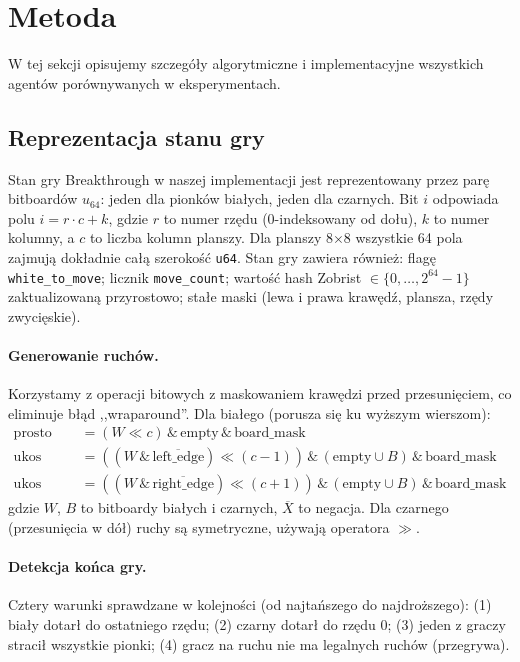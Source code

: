\section{Metoda}
\label{sec:metoda}

W tej sekcji opisujemy szczegóły algorytmiczne i implementacyjne wszystkich
agentów porównywanych w eksperymentach.

\subsection{Reprezentacja stanu gry}

Stan gry Breakthrough w naszej implementacji jest reprezentowany przez parę
bitboardów $u_{64}$: jeden dla pionków białych, jeden dla czarnych. Bit $i$
odpowiada polu $i = r \cdot c + k$, gdzie $r$ to numer rzędu (0-indeksowany
od dołu), $k$ to numer kolumny, a $c$ to liczba kolumn planszy. Dla planszy
8$\times$8 wszystkie 64 pola zajmują dokładnie całą szerokość \texttt{u64}.
Stan gry zawiera również:
flagę \texttt{white\_to\_move};
licznik \texttt{move\_count};
wartość hash Zobrist $\in \{0, \ldots, 2^{64}-1\}$ zaktualizowaną przyrostowo;
stałe maski (lewa i prawa krawędź, plansza, rzędy zwycięskie).

\paragraph{Generowanie ruchów.}
Korzystamy z operacji bitowych z maskowaniem krawędzi przed przesunięciem,
co eliminuje błąd ,,wraparound''. Dla białego (porusza się ku wyższym wierszom):
\begin{align*}
\text{prosto} &= (W \ll c) \,\&\, \text{empty} \,\&\, \text{board\_mask} \\
\text{ukos lewy} &= ((W \,\&\, \overline{\text{left\_edge}}) \ll (c-1)) \,\&\, (\text{empty} \cup B) \,\&\, \text{board\_mask} \\
\text{ukos prawy} &= ((W \,\&\, \overline{\text{right\_edge}}) \ll (c+1)) \,\&\, (\text{empty} \cup B) \,\&\, \text{board\_mask}
\end{align*}
gdzie $W$, $B$ to bitboardy białych i czarnych, $\overline{X}$ to negacja.
Dla czarnego (przesunięcia w dół) ruchy są symetryczne, używają operatora $\gg$.

\paragraph{Detekcja końca gry.}
Cztery warunki sprawdzane w kolejności (od najtańszego do najdroższego):
(1) biały dotarł do ostatniego rzędu;
(2) czarny dotarł do rzędu 0;
(3) jeden z graczy stracił wszystkie pionki;
(4) gracz na ruchu nie ma legalnych ruchów (przegrywa).

